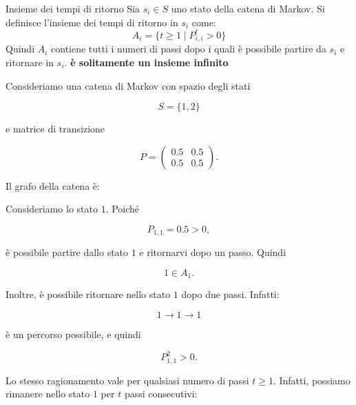 \begin{definition}{Insieme dei tempi di ritorno}
Sia $s_i \in S$ uno stato della catena di Markov. Si definisce l'insieme dei tempi di ritorno in $s_i$ come:
\begin{equation*}
A_i = \{ t \ge 1 \mid P_{i,i}^t > 0 \}
\end{equation*}
Quindi \(A_i\) contiene tutti i numeri di passi dopo i quali è possibile partire da \(s_i\) e ritornare in \(s_i\).
\textbf{è solitamente un insieme infinito}
\end{definition}

\begin{example}
Consideriamo una catena di Markov con spazio degli stati

$$
S=\{1,2\}
$$

e matrice di transizione

$$
P=
\begin{pmatrix}
0.5 & 0.5\\
0.5 & 0.5
\end{pmatrix}.
$$

Il grafo della catena è:

\begin{center}
\end{center}

Consideriamo lo stato $1$. Poiché

$$
P_{1,1}=0.5>0,
$$

è possibile partire dallo stato $1$ e ritornarvi dopo un passo. Quindi

$$
1\in A_1.
$$

Inoltre, è possibile ritornare nello stato $1$ dopo due passi. Infatti:

$$
1\rightarrow1\rightarrow1
$$

è un percorso possibile, e quindi

$$
P^2_{1,1}>0.
$$

Lo stesso ragionamento vale per qualsiasi numero di passi $t\geq1$. Infatti, possiamo rimanere nello stato $1$ per $t$ passi consecutivi:


\end{example}
